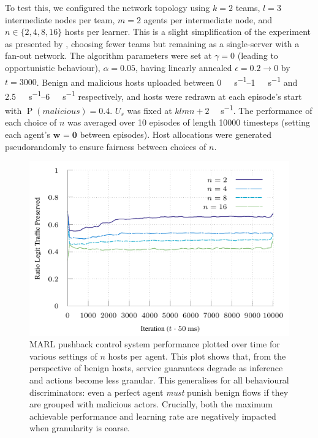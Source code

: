 \documentclass[conference, letterpaper, 10pt, times]{IEEEtran}
\newcommand{\wvec}[1]{\ensuremath{\bm{w}_{#1}}}
\begin{document}
To test this, we configured the network topology using $k=2$ teams, $l=3$ intermediate nodes per team, $m=2$ agents per intermediate node, and $n \in \{2, 4, 8, 16\}$ hosts per learner.
This is a slight simplification of the  experiment as presented by \textcite{DBLP:journals/eaai/MalialisK15}, choosing fewer teams but remaining as a single-server with a fan-out network.
The algorithm parameters were set at $\gamma=0$ (leading to opportunistic behaviour), $\alpha=0.05$, having linearly annealed $\epsilon=0.2 \rightarrow 0$ by $t=3000$.
Benign and malicious hosts uploaded between \SIrange{0}{1}{\mega\bit\per\second} and \SIrange{2.5}{6}{\mega\bit\per\second} respectively, and hosts were redrawn at each episode's start with $\operatorname{P}(\mathit{malicious})=0.4$.
$U_s$ was fixed at $klmn+2$ \si{\mega\bit\per\second}.
The performance of each choice of $n$ was averaged over \num{10} episodes of length \num{10000} timesteps (setting each agent's $\wvec{}=\bm{0}$ between episodes).
Host allocations were generated pseudorandomly to ensure fairness between choices of $n$.

\begin{figure}
	\includegraphics[width=\linewidth]{../plots/online-varyN-binary}
	\caption{
		MARL pushback control system performance plotted over time for various settings of $n$ hosts per agent.
		This plot shows that, from the perspective of benign hosts, service guarantees degrade as inference and actions become less granular.
		This generalises for all behavioural discriminators: even a perfect agent \emph{must} punish benign flows if they are grouped with malicious actors.
		Crucially, both the maximum achievable performance and learning rate are negatively impacted when granularity is coarse.
		\label{fig:marl-granularity}
	}
\end{figure}
\end{document}
